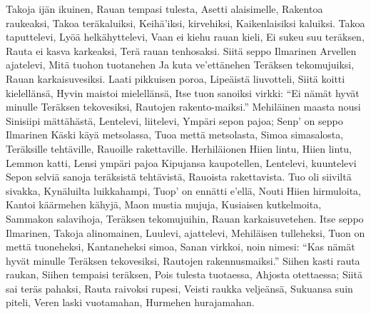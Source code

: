     Takoja ijän ikuinen,
    Rauan tempasi tulesta,
    Asetti alaisimelle,
    Rakentoa raukeaksi,
    Takoa teräkaluiksi,
    Keihä'iksi, kirvehiksi,
    Kaikenlaisiksi kaluiksi.
    Takoa taputtelevi,
    Lyöä helkähyttelevi,
    Vaan ei kiehu rauan kieli,
    Ei sukeu suu teräksen,
    Rauta ei kasva karkeaksi,
    Terä rauan tenhosaksi.
  \endverse
  \beginverse
    Siitä seppo Ilmarinen
    Arvellen ajatelevi,
    Mitä tuohon tuotanehen
    Ja kuta ve'ettänehen
    Teräksen tekomujuiksi,
    Rauan karkaisuvesiksi.
    Laati pikkuisen poroa,
    Lipeäistä liuvotteli,
    Siitä koitti kielellänsä,
    Hyvin maistoi mielellänsä,
    Itse tuon sanoiksi virkki:
    ``Ei nämät hyvät minulle
    Teräksen tekovesiksi,
    Rautojen rakento-maiksi.''
  \endverse
  \beginverse
    Mehiläinen maasta nousi
    Sinisiipi mättähästä,
    Lentelevi, liitelevi,
    Ympäri sepon pajoa;
    Senp' on seppo Ilmarinen
    Käski käyä metsolassa,
    Tuoa mettä metsolasta,
    Simoa simasalosta,
    Teräksille tehtäville,
    Rauoille rakettaville.
  \endverse
  \beginverse
    Herhiläionen Hiien lintu,
    Hiien lintu, Lemmon katti,
    Lensi ympäri pajoa
    Kipujansa kaupotellen,
    Lentelevi, kuuntelevi
    Sepon selviä sanoja
    teräksistä tehtävistä,
    Rauoista rakettavista.
  \endverse
  \beginverse
    Tuo oli siiviltä sivakka,
    Kynäluilta luikkahampi,
    Tuop' on ennätti e'ellä,
    Nouti Hiien hirmuloita,
    Kantoi käärmehen kähyjä,
    Maon mustia mujuja,
    Kusiaisen kutkelmoita,
    Sammakon salavihoja,
    Teräksen tekomujuihin,
    Rauan karkaisuvetehen.
  \endverse
  \beginverse
    Itse seppo Ilmarinen,
    Takoja alinomainen,
    Luulevi, ajattelevi,
    Mehiläisen tulleheksi,
    Tuon on mettä tuoneheksi,
    Kantaneheksi simoa,
    Sanan virkkoi, noin nimesi:
    ``Kas nämät hyvät minulle
    Teräksen tekovesiksi,
    Rautojen rakennusmaiksi.''
    Siihen kasti rauta raukan,
    Siihen tempaisi teräksen,
    Pois tulesta tuotaessa,
    Ahjosta otettaessa;
    Siitä sai teräs pahaksi,
    Rauta raivoksi rupesi,
    Veisti raukka veljeänsä,
    Sukuansa suin piteli,
    Veren laski vuotamahan,
    Hurmehen hurajamahan.
  \endverse
\endsong


